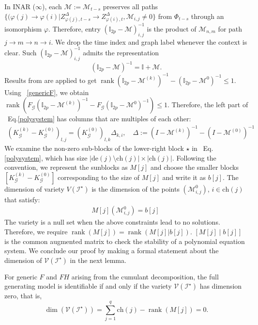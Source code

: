 \documentclass[10pt]{article}
\numberwithin{figure}{section}
\begin{document}
 In INAR ($\infty$), each  $\mathcal{M}:=\mathcal{M}_{t-s}$ preserves all paths \(\{(\varphi(j)\rightarrow \varphi(i)|Z^{\Delta}_{\varphi(j),t-s}\rightarrow Z^{\Delta}_{\varphi(i),t}, \mathcal{M}_{i,j}\ne 0 \}\) from $\Phi_{t-s}$ through an isomorphism $\varphi$. Therefore, entry $(\mathbb{I}_{2p}-\mathcal{M})^{-1}_{i,j}$ is the product of $\mathcal{M}_{n,m}$  for path $j\rightarrow m \rightarrow n \rightarrow i$. We drop the time index and graph label whenever the context is clear. Such $(\mathbb{I}_{2p}-\mathcal{M})^{-1}_{i,j}$ admits the representation
\[
(\mathbb{I}_{2p}-\mathcal{M})^{-1}= \mathbb{I} +\mathcal{M}.
\]
Results from \citep{carreno2024linear} are applied to get $\operatorname{rank}(\mathbb{I}_{2p}-\mathcal{M}^{(k)})^{-1}-(\mathbb{I}_{2p}-\mathcal{M}^{0})^{-1}\le 1$. Using ~\autoref{genericF}, we obtain $\operatorname{rank}(F_{\mathcal{\mathscr{G}}}(\mathbb{I}_{2p}-\mathcal{M}^{(k)})^{-1}-F_{\mathcal{\mathscr{G}}}(\mathbb{I}_{2p}-\mathcal{M}^{0})^{-1})\le 1$. Therefore, the left part of ~Eq.\eqref{polysystem} has columns that are multiples of each other:
\begin{align}
    ( K^{(k)}_{\mathscr{G}}-K^{(0)}_{\mathscr{G}})_{l,j}= (K^{(0)}_{\mathscr{G}})_{l,k}\Delta_{k,i},\quad \Delta:= (I-\mathcal{M}^{(k)})^{-1}-(I-\mathcal{M}^{(0)})^{-1}
\end{align}
We examine the non-zero sub-blocks of the lower-right block $\star$ in ~Eq.\eqref{polysystem}, which has size $|\mathrm{de}(j)\setminus \mathrm{ch}(j)|\times |\mathrm{ch}(j)|$.  Following the convention, we represent the sunblocks as $M[j]$ and choose the smaller blocks $ [K^{(k)}_{\mathscr{G}}-K^{(0)}_{\mathscr{G}}]$ corresponding to the size of $M[j]$ and write it as $b[j]$. The dimension of variety $V(\mathcal{I}^{\star})$ is the dimension of the points $(\mathcal{M}^{0}_{i,j})$, $i \in \mathrm{ch}(j)$ that satisfy:
\begin{align}
    M[j](\mathcal{M}^{0}_{i,j}) = b[j]\
\end{align}
The variety is a null set when the above constraints lead to no solutions. Therefore, we require $\operatorname{rank}(M[j]) = \operatorname{rank}(M[j]|b[j])$.  $[M[j] \mid b[j]]$ is the common augmented matrix to check the stability of a polynomial equation system. We conclude our proof by making a formal statement about the dimension of $\mathcal{V}(\mathcal{I}^{\star})$ in the next lemma.
\begin{alemma}
    For generic $F$ and $FH$ arising from the cumulant decomposition, the full generating model is identifiable if and only if the variety $\mathcal{V}(\mathcal{I}^{\star})$ has dimension zero, that is,
    \[
        \dim(\mathcal{V}(\mathcal{I}^{\star})) = \sum\limits_{j=1}^{q} \mathrm{ch}(j) - \operatorname{rank}(M[j]) = 0.
    \]
\end{alemma}
\end{document}
